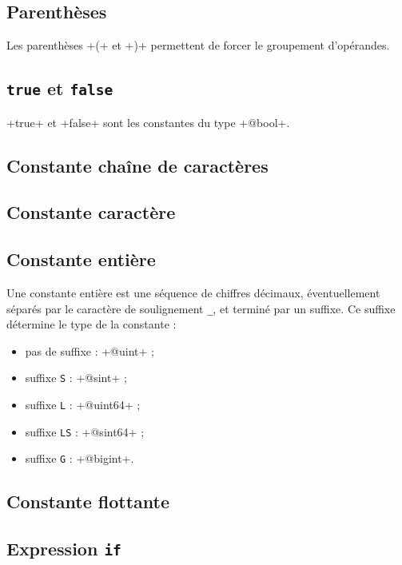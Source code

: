 \subsection{Parenthèses}

Les parenthèses \ggs+(+ et \ggs+)+ permettent de forcer le groupement d'opérandes.






\subsection{\texttt{true} et \texttt{false}}

\ggs+true+ et \ggs+false+ sont les constantes du type \ggs+@bool+.

\subsection{Constante chaîne de caractères}

\subsection{Constante caractère}

\subsection{Constante entière}

Une constante entière est une séquence de chiffres décimaux, éventuellement séparés par le caractère de soulignement \texttt{\_}, et terminé par un suffixe. Ce suffixe détermine le type de la constante :
\begin{itemize}
  \item pas de suffixe : \ggs+@uint+ ;
  \item suffixe \texttt{S} : \ggs+@sint+ ;
  \item suffixe \texttt{L} : \ggs+@uint64+ ;
  \item suffixe \texttt{LS} : \ggs+@sint64+ ;
  \item suffixe \texttt{G} : \ggs+@bigint+.
\end{itemize}

\subsection{Constante flottante}

\subsection{Expression \texttt{if}}

